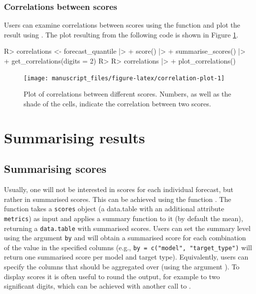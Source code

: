 \documentclass[
]{jss}
\begin{document}
\subsubsection{Correlations between
scores}\label{correlations-between-scores}

Users can examine correlations between scores using the function
 and plot the result using
. The plot resulting from the following code
is shown in Figure \ref{fig:correlation-plot}.

\begin{CodeChunk}
\begin{CodeInput}
R> correlations <- forecast_quantile |>
+   score() |>
+   summarise_scores() |>
+   get_correlations(digits = 2)
R> 
R> correlations |>
+   plot_correlations()
\end{CodeInput}
\begin{figure}[!h]

{\centering \texttt{[image: manuscript\_files/figure-latex/correlation-plot-1]} 

}

\caption[Plot of correlations between different scores]{Plot of correlations between different scores. Numbers, as well as the shade of the cells, indicate the correlation between two scores.}\label{fig:correlation-plot}
\end{figure}
\end{CodeChunk}

\section{Summarising results} \label{sec:summarising}

\subsection{Summarising scores}\label{summarising-scores}

Usually, one will not be interested in scores for each individual
forecast, but rather in summarised scores. This can be achieved using
the function . The function takes a
\texttt{scores} object (a data.table with an additional attribute
\texttt{metrics}) as input and applies a summary function to it (by
default the mean), returning a \texttt{data.table} with summarised
scores. Users can set the summary level using the argument \texttt{by}
and will obtain a summarised score for each combination of the value in
the specified columns (e.g., \texttt{by\ =\ c("model",\ "target\_type")}
will return one summarised score per model and target type).
Equivalently, users can specify the columns that should be aggregated
over (using the argument ). To display scores it is often
useful to round the output, for example to two significant digits, which
can be achieved with another call to .
\end{document}
